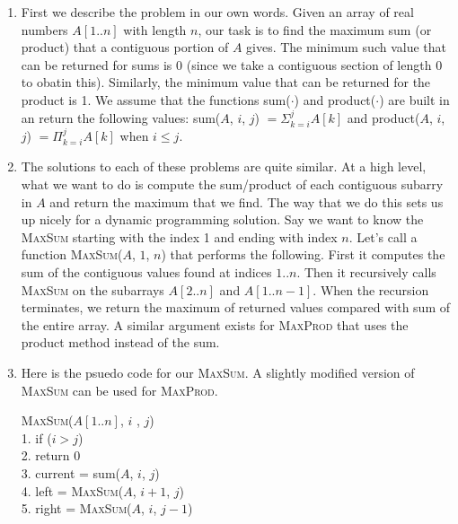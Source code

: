 \documentclass{article}
\begin{document}
\begin{enumerate}
    \item First we describe the problem in our own words.
        Given an array of real numbers $A[1..n]$ with length $n$, our task is to find the maximum sum (or product) that a contiguous portion of $A$ gives.
        The minimum such value that can be returned for sums is 0 (since we take a contiguous section of length 0 to obatin this).
        Similarly, the minimum value that can be returned for the product is 1.
        We assume that the functions sum($\cdot$) and product($\cdot$) are built in an return the following values: sum($A$, $i$, $j$) $ = \Sigma _{k=i}^j A[k] $ and product($A$, $i$, $j$) $ = \Pi _{k=i}^j A[k] $ when $i \leq j$.
    \item The solutions to each of these problems are quite similar.
        At a high level, what we want to do is compute the sum/product of each contiguous subarry in $A$ and return the maximum that we find.
        The way that we do this sets us up nicely for a dynamic programming solution.
        Say we want to know the \textsc{MaxSum} starting with the index 1 and ending with index $n$.
        Let's call a function \textsc{MaxSum}($A$, $1$, $n$) that performs the following.
        First it computes the sum of the contiguous values found at indices $1..n$.
        Then it recursively calls \textsc{MaxSum} on the subarrays $A[2..n]$ and $A[1..n-1]$.
        When the recursion terminates, we return the maximum of returned values compared with sum of the entire array.
        A similar argument exists for \textsc{MaxProd} that uses the product method instead of the sum.
    \item Here is the psuedo code for our \textsc{MaxSum}.
        A slightly modified version of \textsc{MaxSum} can be used for \textsc{MaxProd}.
        \begin{algorithm}
            \textsc{MaxSum}($A[1..n]$, $i$ , $j$) \\
            1. \hspace{1em} if ($i > j$) \\
            2. \hspace{2em}     return 0 \\
            3. \hspace{1em} current = sum($A$, $i$, $j$) \\
            4. \hspace{1em} left = \textsc{MaxSum}($A$, $i+1$, $j$) \\
            5. \hspace{1em} right = \textsc{MaxSum}($A$, $i$, $j-1$) \\

\end{algorithm}
\end{enumerate}
\end{document}
